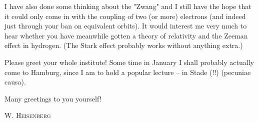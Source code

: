 
I have also done some thinking about the "Zwang" and I still have the hope that it could only come in with the coupling of two (or more) electrons (and indeed just through your ban on equivalent orbits). It would interest me very much to hear whether you have meanwhile gotten a theory of relativity and the Zeeman effect in hydrogen. (The Stark effect probably works without anything extra.)

Please greet your whole institute! Some time in January I shall probably actually come to Hamburg, since I am to hold a popular lecture -- in Stade (!!) (pecuniae causa).

Many greetings to you yourself!

\textsc{W. Heisenberg}

